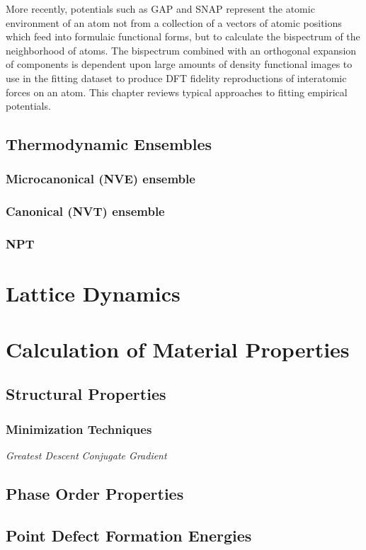 More recently, potentials such as GAP and SNAP represent the atomic environment of an atom not from a collection of a vectors of atomic positions which feed into formulaic functional forms, but to calculate the bispectrum of the neighborhood of atoms.
The bispectrum combined with an orthogonal expansion of components is dependent upon large amounts of density functional images to use in the fitting dataset to produce DFT fidelity reproductions of interatomic forces on an atom.
This chapter reviews typical approaches to fitting empirical potentials.



\subsection{Thermodynamic Ensembles}
\subsubsection{Microcanonical (NVE) ensemble}
\subsubsection{Canonical (NVT) ensemble}
\subsubsection{NPT}
\section{Lattice Dynamics}
\section{Calculation of Material Properties}
\subsection{Structural Properties}
\subsubsection{Minimization Techniques}
\emph{Greatest Descent}
\emph{Conjugate Gradient}
\subsection{Phase Order Properties}
\subsection{Point Defect Formation Energies}
